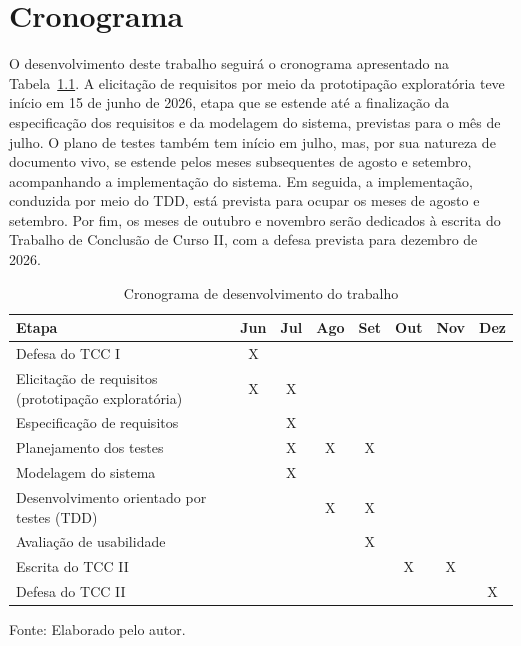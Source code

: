 \chapter{Cronograma}
\label{cap:cronograma}

O desenvolvimento deste trabalho seguirá o cronograma apresentado na Tabela~\ref{tab:cronograma}. A elicitação de requisitos por meio da prototipação exploratória teve início em 15 de junho de 2026, etapa que se estende até a finalização da especificação dos requisitos e da modelagem do sistema, previstas para o mês de julho. O plano de testes também tem início em julho, mas, por sua natureza de documento vivo, se estende pelos meses subsequentes de agosto e setembro, acompanhando a implementação do sistema. Em seguida, a implementação, conduzida por meio do TDD, está prevista para ocupar os meses de agosto e setembro. Por fim, os meses de outubro e novembro serão dedicados à escrita do Trabalho de Conclusão de Curso II, com a defesa prevista para dezembro de 2026.
 
\begin{table}[htb]
  \caption{Cronograma de desenvolvimento do trabalho}
  \label{tab:cronograma}
  \centering
  \begin{tabular}{|l|c|c|c|c|c|c|c|}
    \hline
    \textbf{Etapa} & \textbf{Jun} & \textbf{Jul} & \textbf{Ago} & \textbf{Set} & \textbf{Out} & \textbf{Nov} & \textbf{Dez} \\
    \hline
    Defesa do TCC I & X & & & & & & \\
    \hline
    Elicitação de requisitos (prototipação exploratória) & X & X & & & & & \\
    \hline
    Especificação de requisitos & & X & & & & & \\
    \hline
    Planejamento dos testes & & X & X & X & & & \\
    \hline
    Modelagem do sistema & & X & & & & & \\
    \hline
    Desenvolvimento orientado por testes (TDD) & & & X & X & & & \\
    \hline
    Avaliação de usabilidade & & & & X & & & \\
    \hline
    Escrita do TCC II & & & & & X & X & \\
    \hline
    Defesa do TCC II & & & & & & & X \\
    \hline
  \end{tabular}
 
  \small Fonte: Elaborado pelo autor.
\end{table}